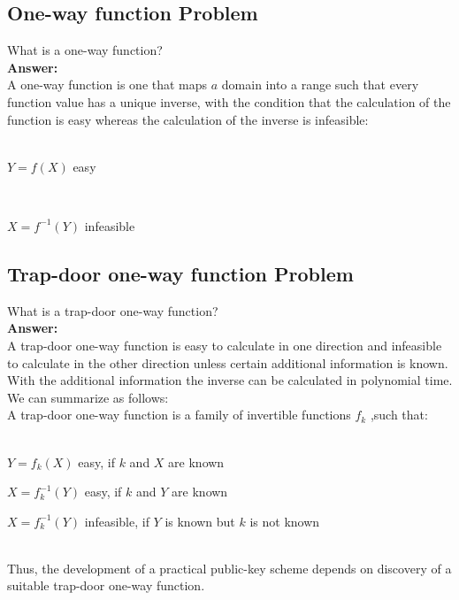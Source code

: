 \documentclass[paper=a4, fontsize=11pt]{scrartcl} %
\numberwithin{equation}{section} %
\numberwithin{figure}{section} %
\numberwithin{table}{section} %
\begin{document}
 \subsection{One-way function Problem \uppercase\expandafter{}}

 What is a one-way function?\\

 \textbf{Answer:}\\

 A one-way function is one that maps $a$ domain into a range such that every function value has a unique inverse, with the condition that the calculation of the function is easy whereas the calculation of the inverse is infeasible:\\
\\
 \centerline{$Y = f(X)$ \hspace{1.1cm} easy}
 \\
 \centerline{\hspace{0.8cm} $X = f^{-1}(Y)$ \hspace{0.8cm} infeasible}

 \subsection{Trap-door one-way function Problem \uppercase\expandafter{}}

 What is a trap-door one-way function?\\

 \textbf{Answer:}\\

  A trap-door one-way function is easy to calculate in one direction and infeasible to calculate in the other direction unless certain additional information is known. With the additional information the inverse can be calculated in polynomial time. We can summarize as follows:\\
  A trap-door one-way function is a family of invertible functions $f_{k}$ ,such that:\\
 \\
 \centerline{$Y = f_{k} (X)$ \hspace{1.2cm} easy, if $k$ and $X$ are known}
 \centerline{$X = f_{k}^{-1}(Y)$ \hspace{1cm} easy, if $k$ and $Y$ are known}
 \centerline{\hspace{2.7cm}$X = f_{k}^{-1}(Y)$ \hspace{1cm} infeasible, if $Y$ is known but $k$ is not known}
 \\
 Thus, the development of a practical public-key scheme depends on discovery of a suitable trap-door one-way function.
\end{document}
